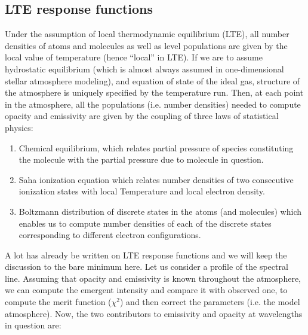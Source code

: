 \documentclass[referee]{aa}
\begin{document}
\subsection{LTE response functions}

Under the assumption of local thermodynamic equilibrium (LTE), all number densities of atoms and molecules as well as level populations are given by the local value of temperature (hence ``local'' in LTE). If we are to assume hydrostatic equilibrium (which is almost always assumed in one-dimensional stellar atmosphere modeling), and equation of state of the ideal gas, structure of the atmosphere is uniquely specified by the temperature run. Then, at each point in the atmosphere, all the populations (i.e. number densities) needed to compute opacity and emissivity are given by the coupling of three laws of statistical physics:
\begin{enumerate}
 \item Chemical equilibrium, which relates partial pressure of species constituting the molecule with the partial pressure due to molecule in question. 
 \item Saha ionization equation which relates number densities of two consecutive ionization states with local Temperature and local electron density.
 \item Boltzmann distribution of discrete states in the atoms (and molecules) which enables us to compute number densities of each of the discrete states corresponding to different electron configurations. 
\end{enumerate}
A lot has already be written on LTE response functions \citep{SIR, dtibook} and we will keep the discussion to the bare minimum here. Let us consider a profile of the spectral line. Assuming that opacity and emissivity is known throughout the atmosphere, we can compute the emergent intensity and compare it with observed one, to compute the merit function ($\chi^2$) and then correct the parameters (i.e. the model atmosphere). Now, the two contributors to emissivity and opacity at wavelengths in question are:
\end{document}
